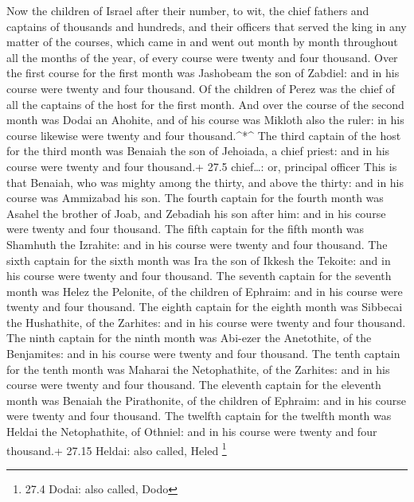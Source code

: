 Now the children of Israel after their number, to wit, the
chief fathers and captains of thousands and hundreds, and their officers
that served the king in any matter of the courses, which came in and
went out month by month throughout all the months of the year, of every
course were twenty and four thousand.  Over the first course
for the first month was Jashobeam the son of Zabdiel: and in his course
were twenty and four thousand.  Of the children of Perez was
the chief of all the captains of the host for the first month.
 And over the course of the second month was Dodai an
Ahohite, and of his course was Mikloth also the ruler: in his course
likewise were twenty and four thousand.\^{}*\^{}  The third
captain of the host for the third month was Benaiah the son of Jehoiada,
a chief priest: and in his course were twenty and four thousand.+ 27.5
chief\ldots: or, principal officer  This is that Benaiah,
who was mighty among the thirty, and above the thirty: and in his course
was Ammizabad his son.  The fourth captain for the fourth
month was Asahel the brother of Joab, and Zebadiah his son after him:
and in his course were twenty and four thousand.  The fifth
captain for the fifth month was Shamhuth the Izrahite: and in his course
were twenty and four thousand.  The sixth captain for the
sixth month was Ira the son of Ikkesh the Tekoite: and in his course
were twenty and four thousand.  The seventh captain for the
seventh month was Helez the Pelonite, of the children of Ephraim: and in
his course were twenty and four thousand.  The eighth
captain for the eighth month was Sibbecai the Hushathite, of the
Zarhites: and in his course were twenty and four thousand. 
The ninth captain for the ninth month was Abi-ezer the Anetothite, of
the Benjamites: and in his course were twenty and four thousand.
 The tenth captain for the tenth month was Maharai the
Netophathite, of the Zarhites: and in his course were twenty and four
thousand.  The eleventh captain for the eleventh month was
Benaiah the Pirathonite, of the children of Ephraim: and in his course
were twenty and four thousand.  The twelfth captain for the
twelfth month was Heldai the Netophathite, of Othniel: and in his course
were twenty and four thousand.+ 27.15 Heldai: also called, Heled
\footnote{27.4 Dodai: also called, Dodo}

